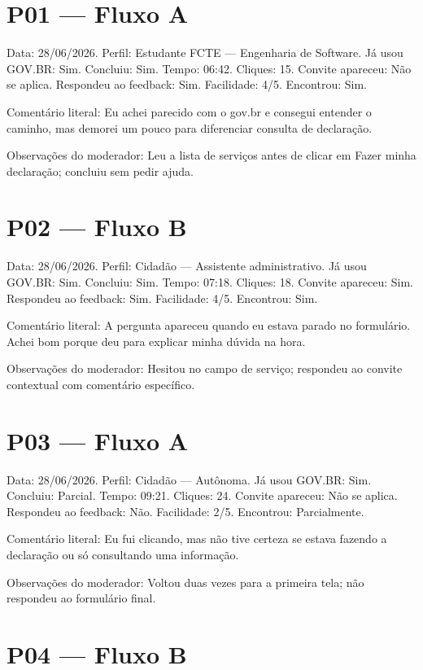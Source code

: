\begin{apendicesenv}
\section{P01 --- Fluxo A}
\label{sec:G.1}

Data: 28/06/2026. Perfil: Estudante FCTE --- Engenharia de Software. Já usou GOV.BR: Sim. Concluiu: Sim. Tempo: 06:42. Cliques: 15. Convite apareceu: Não se aplica. Respondeu ao feedback: Sim. Facilidade: 4/5. Encontrou: Sim.

Comentário literal: Eu achei parecido com o gov.br e consegui entender o caminho, mas demorei um pouco para diferenciar consulta de declaração.

Observações do moderador: Leu a lista de serviços antes de clicar em Fazer minha declaração; concluiu sem pedir ajuda.

\section{P02 --- Fluxo B}
\label{sec:G.2}

Data: 28/06/2026. Perfil: Cidadão --- Assistente administrativo. Já usou GOV.BR: Sim. Concluiu: Sim. Tempo: 07:18. Cliques: 18. Convite apareceu: Sim. Respondeu ao feedback: Sim. Facilidade: 4/5. Encontrou: Sim.

Comentário literal: A pergunta apareceu quando eu estava parado no formulário. Achei bom porque deu para explicar minha dúvida na hora.

Observações do moderador: Hesitou no campo de serviço; respondeu ao convite contextual com comentário específico.

\section{P03 --- Fluxo A}
\label{sec:G.3}

Data: 28/06/2026. Perfil: Cidadão --- Autônoma. Já usou GOV.BR: Sim. Concluiu: Parcial. Tempo: 09:21. Cliques: 24. Convite apareceu: Não se aplica. Respondeu ao feedback: Não. Facilidade: 2/5. Encontrou: Parcialmente.

Comentário literal: Eu fui clicando, mas não tive certeza se estava fazendo a declaração ou só consultando uma informação.

Observações do moderador: Voltou duas vezes para a primeira tela; não respondeu ao formulário final.

\section{P04 --- Fluxo B}
\label{sec:G.4}


\end{apendicesenv}
